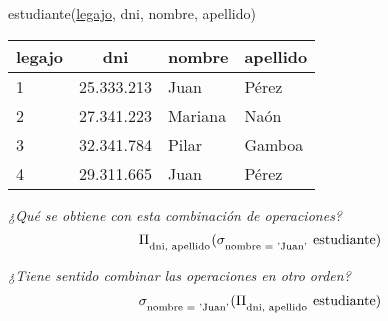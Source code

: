 \documentclass[preview]{standalone}
\begin{document}
\begin{center}
estudiante(\underline{legajo}, dni, nombre, apellido)\\
\vspace{.35cm}
\begin{tabular}{| l | c | l | l | }\hline			
	legajo & dni & nombre & apellido \\\hline			
	1 & 25.333.213 & Juan & P\'erez \\
	2 & 27.341.223 & Mariana & Na\'on\\
	3 & 32.341.784 & Pilar & Gamboa \\
	4 & 29.311.665 & Juan & P\'erez \\\hline	
\end{tabular}
\vspace{0.7cm}

\textit{¿Qué se obtiene con esta combinación de operaciones?}
$${\Pi_{\textsubscript{dni, apellido}} (\sigma_{\textsubscript{nombre = 'Juan'}} \ \textrm{estudiante} )}$$
\vspace{0.2cm}

\textit{¿Tiene sentido combinar las operaciones en otro orden?}
$${\sigma_{\textsubscript{nombre = 'Juan'}} (\Pi_{\textsubscript{dni, apellido}} \ \textrm{estudiante} )}$$
\vspace{.35cm}
\end{center}
\end{document}
